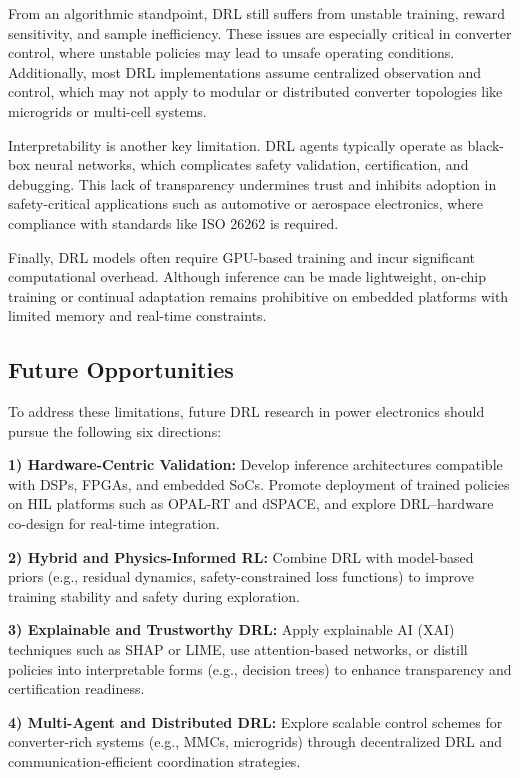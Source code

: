 From an algorithmic standpoint, DRL still suffers from unstable training, reward sensitivity, and sample inefficiency. These issues are especially critical in converter control, where unstable policies may lead to unsafe operating conditions. Additionally, most DRL implementations assume centralized observation and control, which may not apply to modular or distributed converter topologies like microgrids or multi-cell systems.

Interpretability is another key limitation. DRL agents typically operate as black-box neural networks, which complicates safety validation, certification, and debugging. This lack of transparency undermines trust and inhibits adoption in safety-critical applications such as automotive or aerospace electronics, where compliance with standards like ISO 26262 is required.

Finally, DRL models often require GPU-based training and incur significant computational overhead. Although inference can be made lightweight, on-chip training or continual adaptation remains prohibitive on embedded platforms with limited memory and real-time constraints.

\subsection{Future Opportunities}

To address these limitations, future DRL research in power electronics should pursue the following six directions:

\textbf{1) Hardware-Centric Validation:} Develop inference architectures compatible with DSPs, FPGAs, and embedded SoCs. Promote deployment of trained policies on HIL platforms such as OPAL-RT and dSPACE, and explore DRL--hardware co-design for real-time integration.

\textbf{2) Hybrid and Physics-Informed RL:} Combine DRL with model-based priors (e.g., residual dynamics, safety-constrained loss functions) to improve training stability and safety during exploration.

\textbf{3) Explainable and Trustworthy DRL:} Apply explainable AI (XAI) techniques such as SHAP or LIME, use attention-based networks, or distill policies into interpretable forms (e.g., decision trees) to enhance transparency and certification readiness.

\textbf{4) Multi-Agent and Distributed DRL:} Explore scalable control schemes for converter-rich systems (e.g., MMCs, microgrids) through decentralized DRL and communication-efficient coordination strategies.

